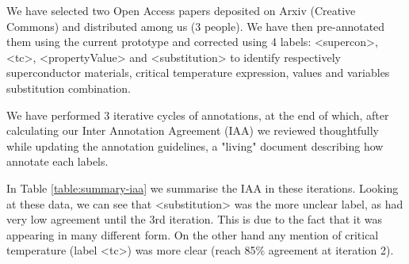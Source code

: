 \documentclass{article}
\begin{document}
We have selected two Open Access papers deposited on Arxiv (Creative Commons) and distributed among us (3 people). We have then pre-annotated them using the current prototype and corrected using 4 labels: <supercon>, <tc>, <propertyValue> and <substitution> to identify respectively superconductor materials, critical temperature expression, values and variables substitution combination. 

We have performed 3 iterative cycles of annotations, at the end of which, after calculating our Inter Annotation Agreement (IAA) we reviewed thoughtfully while updating the annotation guidelines, a "living" document describing how annotate each labels.

In Table \ref{table:summary-iaa} we summarise the IAA in these iterations. Looking at these data, we can see that <substitution> was the more unclear label, as had very low agreement until the 3rd iteration. This is due to the fact that it was appearing in many different form. On the other hand any mention of critical temperature (label <tc>) was more clear (reach 85\% agreement at iteration 2). 
\end{document}
